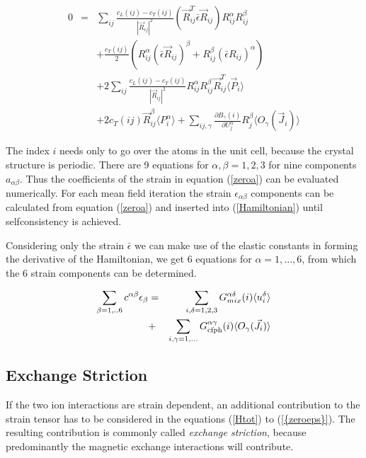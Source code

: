 \begin{eqnarray}\label{zeroa}
0&=& \sum_{ij} \frac{c_L(ij)-c_T(ij)}{|\vec R_{ij}|^2} 
(\vec R_{ij}^T\bar \epsilon \vec R_{ij})R_{ij}^{\alpha}R_{ij}^{\beta}   \\
      && + \frac{c_T(ij)}{2} (R_{ij}^{\alpha} (\bar \epsilon \vec R_{ij})^{\beta}+R_{ij}^{\beta} (\bar \epsilon R_{ij})^{\alpha}) \nonumber \\
&& +2\sum_{ij} \frac{c_L(ij)-c_T(ij)}{|\vec R_{ij}|^2} 
R_{ij}^{\alpha}R_{ij}^{\beta} \vec R_{ij}^T \langle \vec P_{i} \rangle  \nonumber \\
      && +2 c_T(ij) \vec  R_{ij}^{\beta} \langle P_{i}^{\alpha} \rangle
+ \sum_{ij,\gamma}\frac{\partial B_{\gamma}(i)}{\partial U_j^{\alpha}}   R_j^{\beta}  \langle O_{\gamma}(\vec J_i) \rangle \nonumber
 \end{eqnarray}

The index $i$ needs only to go over the atoms in the unit cell, because the crystal structure
is periodic. There are 9 equations for $\alpha,\beta=1,2,3$ for nine components
$a_{\alpha\beta}$. Thus the coefficients of the strain  in  equation (\ref{zeroa})
can be evaluated numerically. For each mean field iteration the strain $\epsilon_{\alpha\beta}$ components
can be calculated from equation (\ref{zeroa}) and inserted into (\ref{Hamiltonian}) until
selfconsistency is achieved.

Considering only the strain $\bar \epsilon$ we can make use of the elastic constants
in forming the derivative of the Hamiltonian, 
we get 6 equations for $\alpha=1,...,6$, from which the 6 strain components can be determined.


\begin{eqnarray}\label{zeroeps}
\sum_{\beta=1,..6}  c^{\alpha\beta} \epsilon_{\beta} &=&
 \sum_{i,\delta=1,2,3}  G_{mix}^{\alpha\delta}(i)\langle u_{i}^{\delta} \rangle  \\
 &+& \sum_{i,\gamma=1,...} G_{\rm cfph}^{\alpha\gamma}(i) \langle O_{\gamma}(\vec J_i) \rangle \nonumber
\end{eqnarray}




\subsection{Exchange Striction}

If the two ion interactions are strain dependent, an additional contribution to the
strain tensor has to be considered in the equations (\ref{Htot}) to (\ref{{zeroeps}}).
The resulting contribution is commonly called {\em exchange striction}, because
predominantly the magnetic exchange interactions will contribute.

